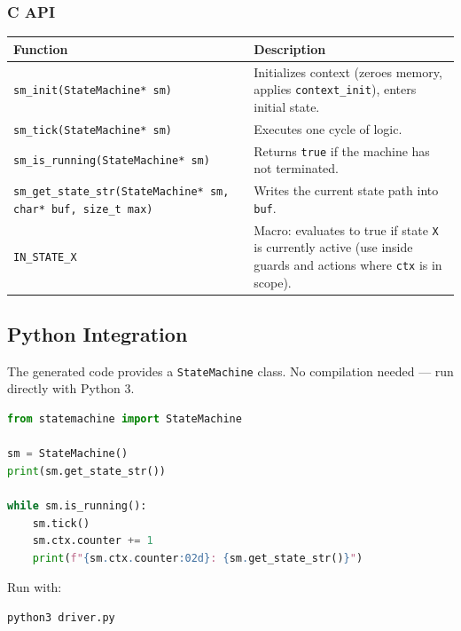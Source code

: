 \documentclass[a4paper,11pt]{article}
\begin{document}
\subsubsection*{C API}
\begin{longtable}{@{}lp{10cm}@{}}
\toprule
\textbf{Function} & \textbf{Description} \\
\midrule
\endhead
\texttt{sm\_init(StateMachine* sm)} & Initializes context (zeroes memory, applies \texttt{context\_init}), enters initial state. \\
\texttt{sm\_tick(StateMachine* sm)} & Executes one cycle of logic. \\
\texttt{sm\_is\_running(StateMachine* sm)} & Returns \texttt{true} if the machine has not terminated. \\
\texttt{sm\_get\_state\_str(StateMachine* sm, char* buf, size\_t max)} & Writes the current state path into \texttt{buf}. \\
\texttt{IN\_STATE\_X} & Macro: evaluates to true if state \texttt{X} is currently active (use inside guards and actions where \texttt{ctx} is in scope). \\
\bottomrule
\end{longtable}

\subsection{Python Integration}
The generated code provides a \texttt{StateMachine} class. No compilation needed --- run directly with Python 3.

\begin{lstlisting}[language=Python, caption={Example Python driver}]
from statemachine import StateMachine

sm = StateMachine()
print(sm.get_state_str())

while sm.is_running():
    sm.tick()
    sm.ctx.counter += 1
    print(f"{sm.ctx.counter:02d}: {sm.get_state_str()}")
\end{lstlisting}

Run with:
\begin{lstlisting}[language=Bash]
python3 driver.py
\end{lstlisting}
\end{document}
